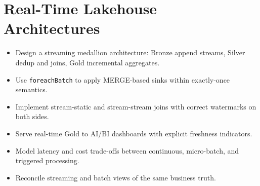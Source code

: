 \chapter{Real-Time Lakehouse Architectures}
%
%
\begin{objectives}
\begin{itemize}
    \item Design a streaming medallion architecture: Bronze append streams, Silver dedup and joins, Gold incremental aggregates.
    \item Use \texttt{foreachBatch} to apply MERGE-based sinks within exactly-once semantics.
    \item Implement stream-static and stream-stream joins with correct watermarks on both sides.
    \item Serve real-time Gold to AI/BI dashboards with explicit freshness indicators.
    \item Model latency and cost trade-offs between continuous, micro-batch, and triggered processing.
    \item Reconcile streaming and batch views of the same business truth.
\end{itemize}
\end{objectives}

